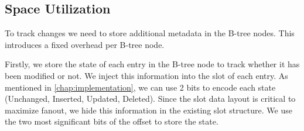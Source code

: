 




\subsection{Space Utilization}
\label{sec:space_overhead}
To track changes we need to store additional metadata in the B-tree nodes.
This introduces a fixed overhead per B-tree node.

Firstly, we store the state of each entry in the B-tree node to track whether it has been modified or not.
We inject this information into the slot of each entry.
As mentioned in \autoref{chap:implementation}, we can use 2 bits to encode each state (Unchanged, Inserted, Updated, Deleted).
Since the slot data layout is critical to maximize fanout, we hide this information in the existing slot structure.
We use the two most significant bits of the offset to store the state.

